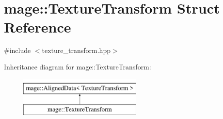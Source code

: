 \hypertarget{structmage_1_1_texture_transform}{}\section{mage\+:\+:Texture\+Transform Struct Reference}
\label{structmage_1_1_texture_transform}


{\ttfamily \#include $<$texture\+\_\+transform.\+hpp$>$}

Inheritance diagram for mage\+:\+:Texture\+Transform\+:\begin{figure}[H]
\begin{center}
\leavevmode
\includegraphics[height=2.000000cm]{structmage_1_1_texture_transform}
\end{center}
\end{figure}

